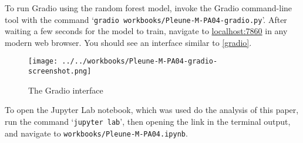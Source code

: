 \documentclass[conference]{IEEEtran}
\begin{document}
To run Gradio using the random forest model, invoke the Gradio command-line
tool with the command `\texttt{gradio workbooks/Pleune-M-PA04-gradio.py}'.
After waiting a few seconds for the model to train, navigate to
\mbox{\href{http://localhost:7860/}{localhost:7860}} in any modern web browser.
You should see an interface similar to \autoref{gradio}.

\begin{figure}[H]
	\texttt{[image: ../../workbooks/Pleune-M-PA04-gradio-screenshot.png]}
	\caption{The Gradio interface}
	\label{gradio}
\end{figure}

To open the Jupyter Lab notebook, which was used do the analysis of this paper,
run the command `\texttt{jupyter lab}', then opening the link in the terminal
output, and navigate to \texttt{workbooks/Pleune-M-PA04.ipynb}.

\printbibliography
\end{document}
